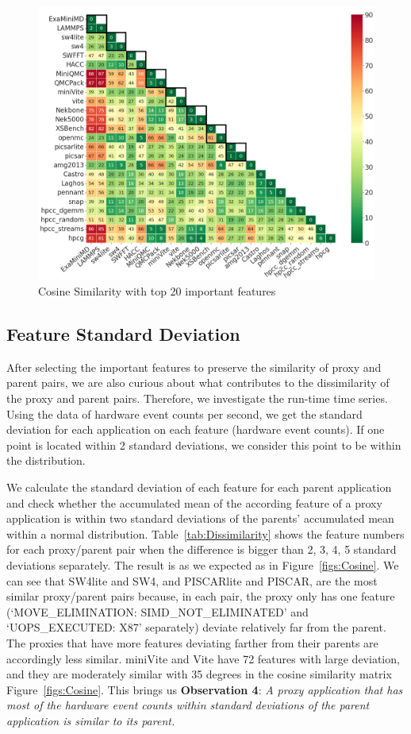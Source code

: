 \begin{figure}[ht]
\centering
\includegraphics[width=\linewidth]{figs/top20cosine_origin_color_font20.png}
\caption{Cosine Similarity with top 20 important features}
\label{figs:top20Cosine}
\end{figure}

\subsection{Feature Standard Deviation}
\label{sec:Dev}
After selecting the important features to preserve the similarity of proxy and parent pairs, we are also curious about what contributes to the dissimilarity of the proxy and parent pairs. Therefore, we investigate the run-time time series. Using the data of hardware event counts per second, we get the standard deviation for each application on each feature (hardware event counts). If one point is located within 2 standard deviations, we consider this point to be within the distribution.


We calculate the standard deviation of each feature for each parent application and check whether the accumulated mean of the according feature of a proxy application is within two standard deviations of the parents' accumulated mean within a normal distribution. 
Table~\ref{tab:Dissimilarity} shows the feature numbers for each proxy/parent pair when the difference is bigger than 2, 3, 4, 5 standard deviations separately. The result is as we expected as in Figure~\ref{figs:Cosine}. We can see that SW4lite and SW4, and PISCARlite and PISCAR, are the most similar proxy/parent pairs because, in each pair, the proxy only has one feature (`MOVE\_ELIMINATION: SIMD\_NOT\_ELIMINATED' and `UOPS\_EXECUTED: X87' separately) deviate relatively far from the parent. The proxies that have more features deviating farther from their parents are accordingly less similar. \eg miniVite and Vite have 72 features with large deviation, and they are moderately similar with 35 degrees in the cosine similarity matrix Figure~\ref{figs:Cosine}. This 
brings us \textbf{Observation 4}: \textit{A proxy application that has most of the hardware event counts within standard deviations of the parent application is similar to its parent.} 



